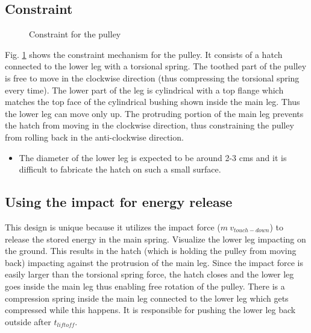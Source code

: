 \subsection{Constraint}
\begin{figure}[!h]
\centering
\caption{Constraint for the pulley}
\label{fig:3_pratik_constraint}
\end{figure}
Fig. \ref{fig:3_pratik_constraint} shows the constraint mechanism for the pulley. It consists of a hatch connected to
the lower leg with a torsional spring. The toothed part of the pulley is free to move in the clockwise direction (thus
compressing the torsional spring every time). The lower part of the leg is cylindrical with a top flange which matches
the top face of the cylindrical bushing shown inside the main leg. Thus the lower leg can move only up. The protruding
portion of the main leg prevents the hatch from moving in the clockwise direction, thus constraining the pulley from
rolling back in the anti-clockwise direction.
\begin{itemize}
\item
The diameter of the lower leg is expected to be around 2-3 cms and it is difficult to fabricate the hatch on such
a small surface.
\end{itemize}

\subsection{Using the impact for energy release}
This design is unique because it utilizes the impact force ($m\:v_{touch-down}$) to release the stored energy in the main
spring. Visualize the lower leg impacting on the ground. This results in the hatch (which is holding the pulley from
moving back) impacting against the protrusion of the main leg. Since the impact force is easily larger than the torsional
spring force, the hatch closes and the lower leg goes inside the main leg thus enabling free rotation of the pulley. There
is a compression spring inside the main leg connected to the lower leg which gets compressed while this happens. It is
responsible for pushing the lower leg back outside after $t_{liftoff}$.

